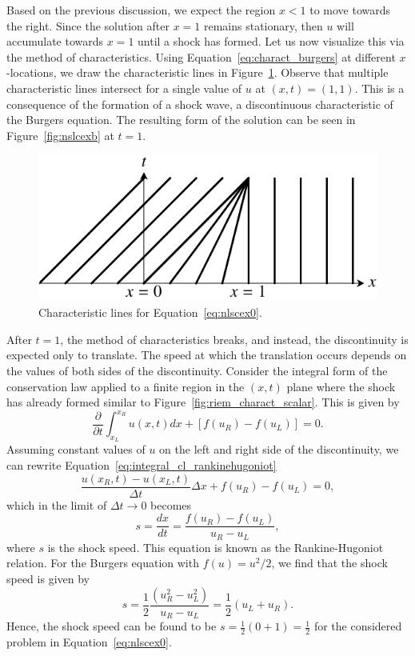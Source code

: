 Based on the previous discussion, we expect the region $x<1$ to move towards the right. Since the solution after $x=1$ remains stationary, then $u$ will accumulate towards $x=1$ until a shock has formed. Let us now visualize this via the method of characteristics. Using Equation~\ref{eq:charact_burgers} at different $x$-locations, we draw the characteristic lines in Figure~\ref{fig:nlscchar}. Observe that multiple characteristic lines intersect for a single value of $u$ at $(x,t) = (1,1)$. This is a consequence of the formation of a shock wave, a discontinuous characteristic of the Burgers equation. The resulting form of the solution can be seen in Figure~\ref{fig:nslcexb} at $t=1$. 
\begin{figure}[htbp]
	\centering
	\includegraphics[width=0.45\linewidth]{Pictures/nonlinear_scalar_characteristics}
	\caption{Characteristic lines for Equation~\ref{eq:nlscex0}.}
	\label{fig:nlscchar}
\end{figure}
After $t=1$, the method of characteristics breaks, and instead, the discontinuity is expected only to translate. The speed at which the translation occurs depends on the values of both sides of the discontinuity. Consider the integral form of the conservation law applied to a finite region in the $(x,t)$ plane where the shock has already formed similar to Figure~\ref{fig:riem_charact_scalar}. This is given by
\begin{equation}
	\frac{\partial}{\partial t} \int_{x_L}^{x_R} u(x,t) dx + [f(u_R) - f(u_L)] = 0.
	\label{eq:integral_cl_rankinehugoniot}
\end{equation}
Assuming constant values of $u$ on the left and right side of the discontinuity, we can rewrite Equation~\ref{eq:integral_cl_rankinehugoniot}
\begin{equation}
	\frac{u(x_R,t)-u(x_L,t)}{\Delta t} \Delta x + f(u_R)-f(u_L) = 0,
\end{equation}
which in the limit of $\Delta t\rightarrow 0$ becomes
\begin{equation}
	s = \frac{dx}{dt} = \frac{f(u_R)-f(u_L)}{u_R-u_L},
\end{equation}
where $s$ is the shock speed. This equation is known as the Rankine-Hugoniot relation. For the Burgers equation with $f(u)=u^2/2$, we find that the shock speed is given by
\begin{equation}
	s = \frac{1}{2} \frac{\left(u_R^2 - u_L^2\right)}{u_R-u_L} = \frac{1}{2} \left(u_L + u_R\right).
\end{equation}
Hence, the shock speed can be found to be $s=\frac{1}{2}\left(0+1\right)=\frac{1}{2}$ for the considered problem in Equation~\ref{eq:nlscex0}. 

